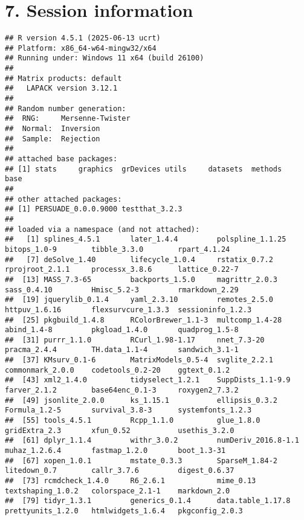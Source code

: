 \documentclass[
]{article}
\begin{document}
\section{7. Session information}\label{session-information}

\begin{verbatim}
## R version 4.5.1 (2025-06-13 ucrt)
## Platform: x86_64-w64-mingw32/x64
## Running under: Windows 11 x64 (build 26100)
## 
## Matrix products: default
##   LAPACK version 3.12.1
## 
## Random number generation:
##  RNG:     Mersenne-Twister 
##  Normal:  Inversion 
##  Sample:  Rejection 
##  
## attached base packages:
## [1] stats     graphics  grDevices utils     datasets  methods   base     
## 
## other attached packages:
## [1] PERSUADE_0.0.0.9000 testthat_3.2.3     
## 
## loaded via a namespace (and not attached):
##   [1] splines_4.5.1       later_1.4.4         polspline_1.1.25    bitops_1.0-9        tibble_3.3.0        rpart_4.1.24       
##   [7] deSolve_1.40        lifecycle_1.0.4     rstatix_0.7.2       rprojroot_2.1.1     processx_3.8.6      lattice_0.22-7     
##  [13] MASS_7.3-65         backports_1.5.0     magrittr_2.0.3      sass_0.4.10         Hmisc_5.2-3         rmarkdown_2.29     
##  [19] jquerylib_0.1.4     yaml_2.3.10         remotes_2.5.0       httpuv_1.6.16       flexsurvcure_1.3.3  sessioninfo_1.2.3  
##  [25] pkgbuild_1.4.8      RColorBrewer_1.1-3  multcomp_1.4-28     abind_1.4-8         pkgload_1.4.0       quadprog_1.5-8     
##  [31] purrr_1.1.0         RCurl_1.98-1.17     nnet_7.3-20         pracma_2.4.4        TH.data_1.1-4       sandwich_3.1-1     
##  [37] KMsurv_0.1-6        MatrixModels_0.5-4  svglite_2.2.1       commonmark_2.0.0    codetools_0.2-20    ggtext_0.1.2       
##  [43] xml2_1.4.0          tidyselect_1.2.1    SuppDists_1.1-9.9   farver_2.1.2        base64enc_0.1-3     roxygen2_7.3.2     
##  [49] jsonlite_2.0.0      ks_1.15.1           ellipsis_0.3.2      Formula_1.2-5       survival_3.8-3      systemfonts_1.2.3  
##  [55] tools_4.5.1         Rcpp_1.1.0          glue_1.8.0          gridExtra_2.3       xfun_0.52           usethis_3.2.0      
##  [61] dplyr_1.1.4         withr_3.0.2         numDeriv_2016.8-1.1 muhaz_1.2.6.4       fastmap_1.2.0       boot_1.3-31        
##  [67] xopen_1.0.1         mstate_0.3.3        SparseM_1.84-2      litedown_0.7        callr_3.7.6         digest_0.6.37      
##  [73] rcmdcheck_1.4.0     R6_2.6.1            mime_0.13           textshaping_1.0.2   colorspace_2.1-1    markdown_2.0       
##  [79] tidyr_1.3.1         generics_0.1.4      data.table_1.17.8   prettyunits_1.2.0   htmlwidgets_1.6.4   pkgconfig_2.0.3    

\end{verbatim}
\end{document}
